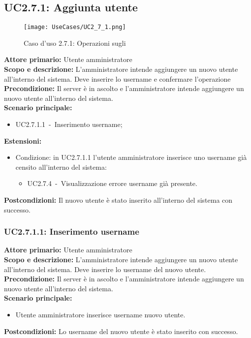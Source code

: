\documentclass{scalatekids-article}
\begin{document}
\subsection{UC2.7.1: Aggiunta utente}

\begin{figure}[H]
  \begin{center}
    \texttt{[image: UseCases/UC2\_7\_1.png]}
    \caption*{Caso d'uso 2.7.1: Operazioni sugli }
  \end{center}
\end{figure}
\textbf{Attore primario:} Utente amministratore\\
\textbf{Scopo e descrizione:} L'amministratore intende aggiungere un nuovo utente all'interno del sistema. Deve inserire lo username e confermare l'operazione\\
\textbf{Precondizione:} Il server è in ascolto e l'amministratore intende aggiungere un nuovo utente all'interno del sistema.\\
\textbf{Scenario principale:}
\begin{itemize}
\item UC2.7.1.1\ -\ Inserimento username;
\end{itemize}
\textbf{Estensioni:}
\begin{itemize}
\item Condizione: in UC2.7.1.1 l'utente amministratore inserisce uno username già censito all'interno del sistema:
  \begin{itemize}
  \item UC2.7.4\ -\ Visualizzazione errore username già presente.
  \end{itemize}
\end{itemize}
\textbf{Postcondizioni:} Il nuovo utente è stato inserito all'interno del sistema con successo.

\subsubsection{UC2.7.1.1: Inserimento username}

\textbf{Attore primario:} Utente amministratore\\
\textbf{Scopo e descrizione:} L'amministratore intende aggiungere un nuovo utente all'interno del sistema. Deve inserire lo username del nuovo utente.\\
\textbf{Precondizione:} Il server è in ascolto e l'amministratore intende aggiungere un nuovo utente all'interno del sistema.\\
\textbf{Scenario principale:}
\begin{itemize}
\item Utente amministratore inserisce username nuovo utente.
\end{itemize}
\textbf{Postcondizioni:} Lo username del nuovo utente è stato inserito con successo.
\end{document}
